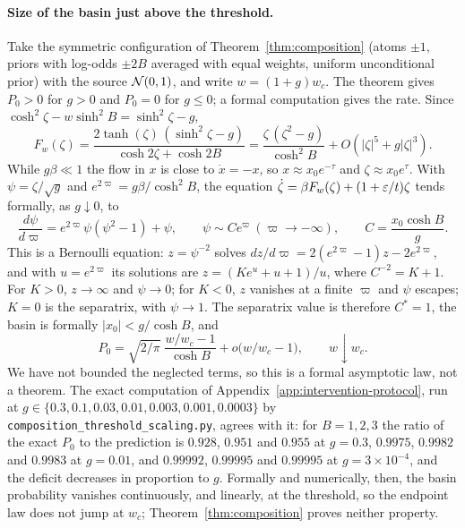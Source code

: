 \documentclass{article} %
\theoremstyle{plain}
\theoremstyle{definition}
\theoremstyle{remark}
\begin{document}
\paragraph{Size of the basin just above the threshold.}\label{apx:threshold-scaling} Take the
symmetric configuration of Theorem~\ref{thm:composition} (atoms $\pm1$, priors with log-odds
$\pm2B$ averaged with equal weights, uniform unconditional prior) with the source $\mathcal{N}(0,1)$, and
write $w=(1+g)w_c$. The theorem gives $P_0>0$ for $g>0$ and $P_0=0$ for $g\le0$; a
formal computation gives the rate. Since $\cosh^2\zeta-w\sinh^2B=\sinh^2\zeta-g$,
\[
F_w(\zeta)=\frac{2\tanh(\zeta)\,(\sinh^2\zeta-g)}{\cosh2\zeta+\cosh2B}
=\frac{\zeta\,(\zeta^2-g)}{\cosh^2B}+O(|\zeta|^5+g|\zeta|^3).
\]
While $g\beta\ll1$ the flow in $x$ is close to $\dot x=-x$, so $x\approx x_0e^{-\tau}$ and
$\zeta\approx x_0e^\tau$. With $\psi=\zeta/\sqrt g$ and $e^{2\varpi}=g\beta/\cosh^2B$, the
equation $\dot \zeta=\beta F_w(\zeta)+(1+\varepsilon/t)\zeta$ tends formally, as $g\downarrow0$, to
\[
\frac{d\psi}{d\varpi}=e^{2\varpi}\psi(\psi^2-1)+\psi,\qquad
\psi\sim Ce^\varpi\ (\varpi\to-\infty),\qquad C=\frac{x_0\cosh B}{g}.
\]
This is a Bernoulli equation: $z=\psi^{-2}$ solves $dz/d\varpi=2(e^{2\varpi}-1)z-2e^{2\varpi}$,
and with $u=e^{2\varpi}$ its solutions are $z=(Ke^u+u+1)/u$, where $C^{-2}=K+1$. For $K>0$,
$z\to\infty$ and $\psi\to0$; for $K<0$, $z$ vanishes at a finite $\varpi$ and $\psi$ escapes;
$K=0$ is the separatrix, with $\psi\to1$. The separatrix value is therefore $C^\ast=1$, the
basin is formally $|x_0|<g/\cosh B$, and
\[
P_0=\sqrt{2/\pi}\;\frac{w/w_c-1}{\cosh B}+o\bigl(w/w_c-1\bigr),\qquad w\downarrow w_c .
\]
We have not bounded the neglected terms, so this is a formal asymptotic law, not a theorem. The
exact computation of Appendix~\ref{app:intervention-protocol}, run at
$g\in\{0.3,0.1,0.03,0.01,0.003,0.001,0.0003\}$ by
\texttt{composition\_threshold\_scaling.py}, agrees with it: for $B=1,2,3$ the ratio of the
exact $P_0$ to the prediction is $0.928$, $0.951$ and $0.955$ at $g=0.3$, $0.9975$,
$0.9982$ and $0.9983$ at $g=0.01$, and $0.99992$, $0.99995$ and $0.99995$ at
$g=3\times10^{-4}$, and the deficit decreases in proportion to $g$. Formally and
numerically, then, the basin probability vanishes continuously, and linearly, at the threshold, so
the endpoint law does not jump at $w_c$; Theorem~\ref{thm:composition} proves neither property.
\end{document}
